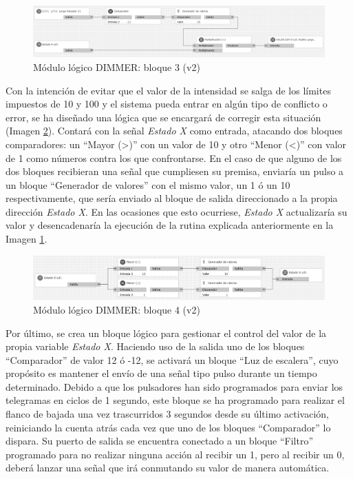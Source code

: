 \begin{figure}[H]
\includegraphics[width=1.15\textwidth]{figures/log_dimm_b23.png}  
\caption{Módulo lógico DIMMER: bloque 3 (v2)}
\label{fig:log_dimm_b23}
\end{figure}

Con la intención de evitar que el valor de la intensidad se salga de los límites impuestos de 10 y 100 y el sistema pueda entrar en algún tipo de conflicto o error, se ha diseñado una lógica que se encargará de corregir esta situación (Imagen \ref{fig:log_dimm_b24}). Contará con la señal \textit{Estado X} como entrada, atacando dos bloques comparadores: un “Mayor (>)” con un valor de 10 y otro “Menor (<)” con valor de 1 como números contra los que confrontarse. En el caso de que alguno de los dos bloques recibieran una señal que cumpliesen su premisa, enviaría un pulso a un bloque “Generador de valores” con el mismo valor, un 1 ó un 10 respectivamente, que sería enviado al bloque de salida direccionado a la propia dirección \textit{Estado X}. En las ocasiones que esto ocurriese, \textit{Estado X} actualizaría su valor y desencadenaría la ejecución de la rutina explicada anteriormente en la Imagen \ref{fig:log_dimm_b23}.

\begin{figure}[H]
\includegraphics[width=1.05\textwidth]{figures/log_dimm_b24.png}  
\caption{Módulo lógico DIMMER: bloque 4 (v2)}
\label{fig:log_dimm_b24}
\end{figure}

Por último, se crea un bloque lógico para gestionar el control del valor de la propia variable \textit{Estado X}. Haciendo uso de la salida uno de los bloques “Comparador” de valor 12 ó -12, se activará un bloque “Luz de escalera”, cuyo propósito es mantener el envío de una señal tipo pulso durante un tiempo determinado. Debido a que los pulsadores han sido programados para enviar los telegramas en ciclos de 1 segundo, este bloque se ha programado para realizar el flanco de bajada una vez trascurridos 3 segundos desde su último activación, reiniciando la cuenta atrás cada vez que uno de los bloques “Comparador” lo dispara. Su puerto de salida se encuentra conectado a un bloque “Filtro” programado para no realizar ninguna acción al recibir un 1, pero al recibir un 0, deberá lanzar una señal que irá conmutando su valor de manera automática.  

